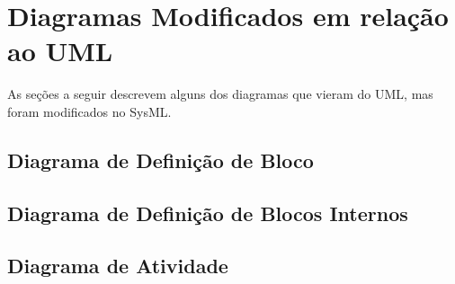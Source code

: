 \section{Diagramas Modificados em relação ao UML}
As seções a seguir descrevem alguns dos diagramas que vieram do UML, mas foram modificados no SysML.

\subsection{Diagrama de Definição de Bloco}


\subsection{Diagrama de Definição de Blocos Internos}


\subsection{Diagrama de Atividade}
